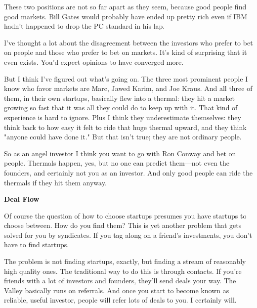 These two positions are not so far apart as they
                  seem, because good people find good markets. Bill Gates would
                  probably have ended up pretty rich even if IBM hadn't happened
                  to drop the PC standard in his lap.

I've thought a
                  lot about the disagreement between the investors who prefer to
                  bet on people and those who prefer to bet on markets. It's
                  kind of surprising that it even exists. You'd expect opinions
                  to have converged more.

But I think I've figured
                  out what's going on. The three most prominent people I know
                  who favor markets are Marc, Jawed Karim, and Joe Kraus. And
                  all three of them, in their own startups, basically flew into
                  a thermal: they hit a market growing so fast that it was all
                  they could do to keep up with it. That kind of experience is
                  hard to ignore. Plus I think they underestimate themselves:
                  they think back to how easy it felt to ride that huge thermal
                  upward, and they think "anyone could have done it." But that
                  isn't true; they are not ordinary people.

So as an
                  angel investor I think you want to go with Ron Conway and bet
                  on people. Thermals happen, yes, but no one can predict
                  them---not even the founders, and certainly not you as an
                  investor. And only good people can ride the thermals if they
                  hit them anyway.

\textbf{Deal Flow}

Of
                  course the question of how to choose startups presumes you
                  have startups to choose between. How do you find them? This is
                  yet another problem that gets solved for you by syndicates. If
                  you tag along on a friend's investments, you don't have to
                  find startups.

The problem is not finding startups,
                  exactly, but finding a stream of reasonably high quality ones.
                  The traditional way to do this is through contacts. If you're
                  friends with a lot of investors and founders, they'll send
                  deals your way. The Valley basically runs on referrals. And
                  once you start to become known as reliable, useful investor,
                  people will refer lots of deals to you. I certainly will.

